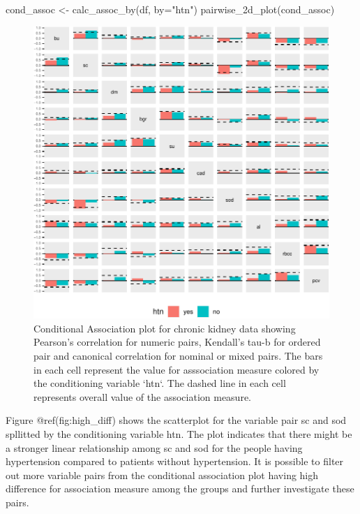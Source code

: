 \begin{Schunk}
\begin{Sinput}
cond_assoc <- calc_assoc_by(df, by="htn")
pairwise_2d_plot(cond_assoc)
\end{Sinput}
\begin{figure}

{\centering \includegraphics{rj_paper_files/figure-latex/cond-assoc-1} 

}

\caption[Conditional Association plot for chronic kidney data showing Pearson's correlation for numeric pairs, Kendall's tau-b for ordered pair and canonical correlation for nominal or mixed pairs]{Conditional Association plot for chronic kidney data showing Pearson's correlation for numeric pairs, Kendall's tau-b for ordered pair and canonical correlation for nominal or mixed pairs. The bars in each cell represent the value for asssociation measure colored by the conditioning variable `htn`. The dashed line in each cell represents overall value of the association measure.}\label{fig:cond-assoc}
\end{figure}
\end{Schunk}

Figure @ref(fig:high\_diff) shows the scatterplot for the variable pair
sc and sod spllitted by the conditioning variable htn. The plot
indicates that there might be a stronger linear relationship among sc
and sod for the people having hypertension compared to patients without
hypertension. It is possible to filter out more variable pairs from the
conditional association plot having high difference for association
measure among the groups and further investigate these pairs.

